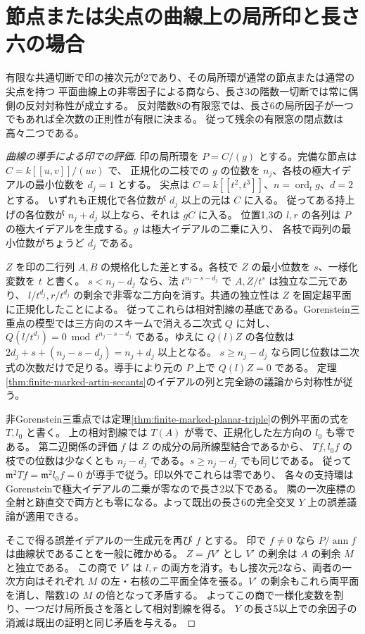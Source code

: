 \section{節点または尖点の曲線上の局所印と長さ六の場合}
\label{sec:finite-nodal-cuspidal-marks}
\begin{theorem}\label{thm:finite-nodal-cuspidal-marks}
有限な共通切断で印の接次元が2であり、その局所環が通常の節点または通常の尖点を持つ
平面曲線上の非零因子による商なら、長さ3の階数一切断では常に偶側の反対対称性が成立する。
反対階数8の有限窓では、長さ6の局所因子が一つでもあれば全次数の正則性が有限に決まる。
従って残余の有限窓の閉点数は高々二つである。
\end{theorem}
\begin{proof}[曲線の導手による印での評価]
印の局所環を $P=C/(g)$ とする。完備な節点は $C=k[[u,v]]/(uv)$ で、
正規化の二枝での $g$ の位数を $n_j$、各枝の極大イデアルの最小位数を $d_j=1$ とする。
尖点は $C=k[[t^2,t^3]]$、$n=\operatorname{ord}_t g$、$d=2$ とする。
いずれも正規化で各位数が $d_j$ 以上の元は $C$ に入る。
従ってある持上げの各位数が $n_j+d_j$ 以上なら、それは $gC$ に入る。
位置1,3の $l,r$ の各列は $P$ の極大イデアルを生成する。$g$ は極大イデアルの二乗に入り、
各枝で両列の最小位数がちょうど $d_j$ である。

$Z$ を印の二行列 $A,B$ の規格化した差とする。各枝で $Z$ の最小位数を $s$、一様化変数を $t$ と書く。
$s<n_j-d_j$ なら、法 $t^{n_j-s-d_j}$ で $A,Z/t^s$ は独立な二元であり、
$l/t^{d_j},r/t^{d_j}$ の剰余で非零な二方向を消す。共通の独立性は $Z$ を固定超平面に正規化したことによる。
従ってこれらは相対割線の基底である。Gorenstein三重点の模型では三方向のスキームで消える二次式 $Q$ に対し、
$Q(l/t^{d_j})=0\bmod t^{n_j-s-d_j}$ である。ゆえに $Q(l)Z$ の各位数は
$2d_j+s+(n_j-s-d_j)=n_j+d_j$ 以上となる。
$s\ge n_j-d_j$ なら同じ位数は二次式の次数だけで足りる。導手により元の $P$ 上で $Q(l)Z=0$ である。
定理\ref{thm:finite-marked-artin-secants}のイデアルの列と完全跡の議論から対称性が従う。

非Gorenstein三重点では定理\ref{thm:finite-marked-planar-triple}の例外平面の式を $T,l_0$ と書く。
上の相対割線では $T(A)$ が零で、正規化した左方向の $l_0$ も零である。
第二辺関係の評価 $f$ は $Z$ の成分の局所線型結合であるから、
$T f,l_0 f$ の枝での位数は少なくとも $n_j-d_j$ である。$s\ge n_j-d_j$ でも同じである。
従って $\mathfrak m^2 T f=\mathfrak m^2 l_0 f=0$ が導手で従う。印以外でこれらは零であり、
各々の支持環はGorensteinで極大イデアルの二乗が零なので長さ2以下である。
隣の一次座標の全射と跡直交で両方とも零になる。よって既出の長さ6の完全交叉 $Y$ 上の誤差議論が適用できる。

そこで得る誤差イデアルの一生成元を再び $f$ とする。
印で $f\ne0$ なら $P/\operatorname{ann}f$ は曲線状であることを一般に確かめる。
$Z=fV'$ とし $V'$ の剰余は $A$ の剰余 $M$ と独立である。
この商で $V'$ は $l,r$ の両方を消す。もし接次元2なら、両者の一次方向はそれぞれ
$M$ の左・右核の二平面全体を張る。$V'$ の剰余もこれら両平面を消し、階数1の $M$ の倍となって矛盾する。
よってこの商で一様化変数を割り、一つだけ局所長さを落として相対割線を得る。
$Y$ の長さ5以上での余因子の消滅は既出の証明と同じ矛盾を与える。
\end{proof}

